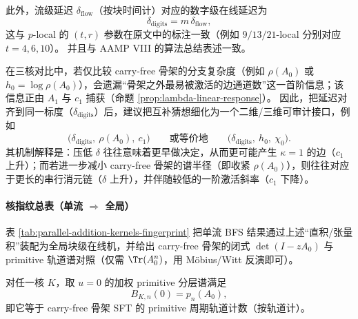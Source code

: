 此外，流级延迟 $\delta_{\mathrm{flow}}$（按块时间计）对应的数字级在线延迟为
\[
\delta_{\mathrm{digits}}=m\,\delta_{\mathrm{flow}},
\]
这与 $p$-local 的 $(t,r)$ 参数在原文中的标注一致（例如 $9/13/21$-local 分别对应 $t=4,6,10$）。\cite{FrougnyHellerPelantovaSvobodovaParallelAlgorithmsSlides,Frougny2012NumbersAsStreamsLeiden}
并且与 AAMP VIII 的算法总结表述一致。 \cite{SvobodovaAAMPVIIIParallelAddition}

\begin{remark}\label{rem:entropy-delay-complement-c1}
在三核对比中，若仅比较 carry-free 骨架的分支复杂度（例如 \(\rho(A_0)\) 或 \(h_0=\log\rho(A_0)\)），会遗漏“骨架之外最易被激活的边通道数”这一首阶信息；该信息正由 \(A_1\) 与 \(c_1\) 捕获（命题 \ref{prop:lambda-linear-response}）。
因此，把延迟对齐到同一标度（\(\delta_{\mathrm{digits}}\)）后，建议把互补猜想细化为一个二维/三维可审计接口，例如
$$
\bigl(\delta_{\mathrm{digits}},\ \rho(A_0),\ c_1\bigr)
\qquad\text{或等价地}\qquad
\bigl(\delta_{\mathrm{digits}},\ h_0,\ \chi_0\bigr).
$$
其机制解释是：压低 \(\delta\) 往往意味着更早做决定，从而更可能产生 \(\kappa=1\) 的边（\(c_1\) 上升）；而若进一步减小 carry-free 骨架的谱半径（即收紧 \(\rho(A_0)\)），则往往对应于更长的串行消元链（\(\delta\) 上升），并伴随较低的一阶激活斜率（\(c_1\) 下降）。
\end{remark}



\paragraph{核指纹总表（单流 $\Rightarrow$ 全局）}
表 \ref{tab:parallel-addition-kernels-fingerprint} 把单流 BFS 结果通过上述“直积/张量积”装配为全局块级在线机，并给出 carry-free 骨架的闭式 $\det(I-zA_0)$ 与 primitive 轨道谱对照（仅需 $\Tr(A_0^n)$，用 Möbius/Witt 反演即可）。


\begin{corollary}\label{cor:Bn0-equals-primitive-skeleton}
对任一核 $K$，取 $u=0$ 的加权 primitive 分层谱满足
\[
B_{K,n}(0)=p_n(A_0),
\]
即它等于 carry-free 骨架 SFT 的 primitive 周期轨道计数（按轨道计）。
\end{corollary}




